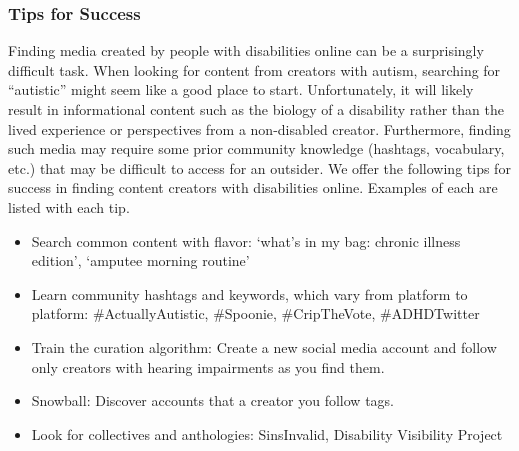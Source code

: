 \subsubsection{Tips for Success}
Finding media created by people with disabilities online can be a surprisingly difficult task. When looking for content from creators with autism, searching for ``autistic'' might seem like a good place to start. Unfortunately, it will likely result in informational content such as the biology of a disability rather than the lived experience or perspectives from a non-disabled creator. Furthermore, finding such media may require some prior community knowledge (hashtags, vocabulary, etc.) that may be difficult to access for an outsider. We offer the following tips for success in finding content creators with disabilities online. Examples of each are listed with each tip. 
 
\begin{itemize}
  \item Search common content with flavor: `what's in my bag: chronic illness edition', `amputee morning routine'
  \item Learn community hashtags and keywords, which vary from platform to platform: \#ActuallyAutistic, \#Spoonie, \#CripTheVote, \#ADHDTwitter
  \item Train the curation algorithm: Create a new social media account and follow only creators with hearing impairments as you find them. 
  \item Snowball: Discover accounts that a creator you follow tags. 
  \item Look for collectives and anthologies: SinsInvalid, Disability Visibility Project
\end{itemize}


